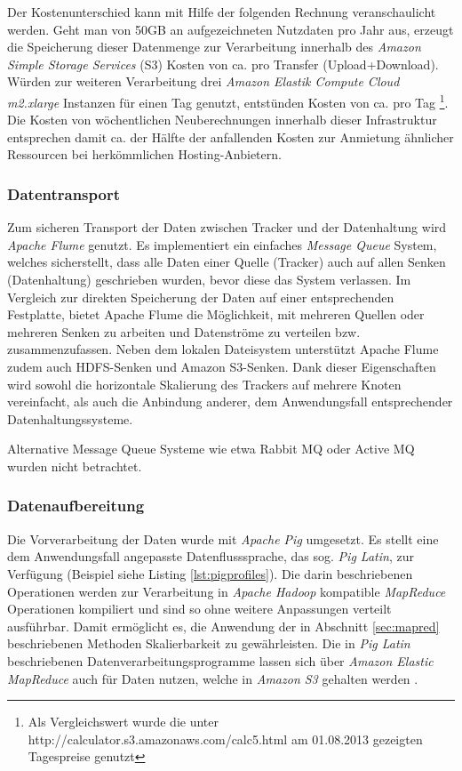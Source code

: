 Der Kostenunterschied kann mit Hilfe der folgenden Rechnung veranschaulicht werden. Geht man von 50GB an aufgezeichneten Nutzdaten pro Jahr aus, erzeugt die Speicherung dieser Datenmenge zur Verarbeitung innerhalb des \textit{Amazon Simple Storage Services} (S3) Kosten von ca.  pro Transfer (Upload+Download). Würden zur weiteren Verarbeitung drei \textit{Amazon Elastik Compute Cloud} \textit{m2.xlarge} Instanzen für einen Tag genutzt, entstünden Kosten von ca.  pro Tag \footnote{Als Vergleichswert wurde die unter http://calculator.s3.amazonaws.com/calc5.html am 01.08.2013 gezeigten Tagespreise genutzt}. Die Kosten von wöchentlichen Neuberechnungen innerhalb dieser Infrastruktur entsprechen damit ca. der Hälfte der anfallenden Kosten zur Anmietung ähnlicher Ressourcen bei herkömmlichen Hosting-Anbietern.

\subsubsection{Datentransport} \label{sec:datatransp} Zum sicheren Transport der Daten zwischen Tracker und der Datenhaltung wird \textit{Apache Flume} genutzt. Es implementiert ein einfaches \textit{Message Queue} System, welches sicherstellt, dass alle Daten einer Quelle (Tracker) auch auf allen Senken (Datenhaltung) geschrieben wurden, bevor diese das System verlassen. Im Vergleich zur direkten Speicherung der Daten auf einer entsprechenden Festplatte, bietet Apache Flume die Möglichkeit, mit mehreren Quellen oder mehreren Senken zu arbeiten und Datenströme zu verteilen bzw. zusammenzufassen. Neben dem lokalen Dateisystem unterstützt Apache Flume zudem auch HDFS-Senken und Amazon S3-Senken. Dank dieser Eigenschaften wird sowohl die horizontale Skalierung des Trackers auf mehrere Knoten vereinfacht, als auch die Anbindung anderer, dem Anwendungsfall entsprechender Datenhaltungssysteme.

Alternative Message Queue Systeme wie etwa Rabbit MQ oder Active MQ wurden nicht betrachtet.

\subsubsection{Datenaufbereitung} Die Vorverarbeitung der Daten wurde mit \textit{Apache Pig} umgesetzt. Es stellt eine dem Anwendungsfall angepasste Datenflusssprache, das sog. \textit{Pig Latin}, zur Verfügung (Beispiel siehe Listing \ref{lst:pigprofiles}). Die darin beschriebenen Operationen werden zur Verarbeitung in \textit{Apache Hadoop} kompatible \textit{MapReduce} Operationen kompiliert und sind so ohne weitere Anpassungen verteilt ausführbar.  Damit ermöglicht es, die Anwendung der in Abschnitt \ref{sec:mapred} beschriebenen Methoden Skalierbarkeit zu gewährleisten. Die in \textit{Pig Latin} beschriebenen Datenverarbeitungsprogramme lassen sich über \textit{Amazon Elastic MapReduce} auch für Daten nutzen, welche in \textit{Amazon S3} gehalten werden \citep{Lin2012}.

